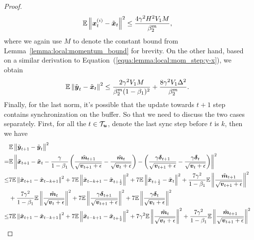 \begin{proof}
\begin{align*}
\mathbb{E}\left\| \boldsymbol{x}_t^{(i)} - \tilde{\boldsymbol{x}}_t \right\|^2 \leq \frac{4\gamma^2H^2V_1M}{\beta_2^m},
\end{align*}
where we again use $M$ to denote the constant bound from Lemma~\ref{lemma:local:momentum_bound} for brevity.
On the other hand, based on a similar derivation to Equation~(\ref{equa:lemma:local:mom_step:y-x}), we obtain
\begin{align*}
\mathbb{E}\left\| \tilde{\boldsymbol{y}}_t - \tilde{\boldsymbol{x}}_t \right\|^2 \leq \frac{2\gamma^2V_1M}{\beta_2^m(1-\beta_1)^2} + \frac{8\gamma^2V_1\Delta^2}{\beta_2^m}.
\end{align*}
Finally, for the last norm, it's possible that the update towards $t+1$ step contains synchronization on the buffer. So that we need to discuss the two cases separately. First, for all the $t\in\mathcal{T}_{\boldsymbol{u}}$, denote the last sync step before $t$ is $k$, then we have
\begin{align*}
    & \mathbb{E}\left\| \tilde{\*{y}}_{t+1} - \tilde{\*{y}}_t \right\|^2 \\
    = & \mathbb{E}\left\| \tilde{\*{x}}_{t+1} - \tilde{\*{x}}_t - \frac{\gamma}{1- \beta_1} \left(\frac{\tilde{\*{m}}_{t+1}}{\sqrt{\*v_{t+1}+\epsilon}} - \frac{\tilde{\*{m}}_{t}}{\sqrt{\*v_{t}+\epsilon}} \right) - \left( \frac{\gamma\*{\delta}_{t+1}}{\sqrt{\*v_{t+1}+\epsilon}} - \frac{\gamma\*{\delta}_{t}}{\sqrt{\*v_{t}+\epsilon}}\right) \right\|^2 \\
\leq & 7\mathbb{E}\left\| \tilde{\*{x}}_{t+1} - \tilde{\*{x}}_{t-k+1} \right\|^2 + 7\mathbb{E}\left\| \tilde{\*{x}}_{t-k+1} - \tilde{\*{x}}_{t+\frac{1}{2}} \right\|^2 + 
    7\mathbb{E}\left\| \tilde{\*{x}}_{t+\frac{1}{2}} - \tilde{\*{x}}_{t} \right\|^2 + 
    \frac{7\gamma^2}{1-\beta_1}\mathbb{E}\left\| \frac{\tilde{\*{m}}_{t+1}}{\sqrt{\*v_{t+1}+\epsilon}} \right\|^2 \\
    & + 
    \frac{7\gamma^2}{1-\beta_1}\mathbb{E}\left\| \frac{\tilde{\*{m}}_{t}}{\sqrt{\*v_{t}+\epsilon}} \right\|^2 + 
    7\mathbb{E}\left\| \frac{\gamma\*{\delta}_{t+1}}{\sqrt{\*v_{t+1}+\epsilon}} \right\|^2 + 
    7\mathbb{E}\left\| \frac{\gamma\*{\delta}_{t}}{\sqrt{\*v_{t}+\epsilon}} \right\|^2 \\
\leq & 7\mathbb{E}\left\| \tilde{\*{x}}_{t+1} - \tilde{\*{x}}_{t-k+1} \right\|^2 + 7\mathbb{E}\left\| \tilde{\*{x}}_{t-k+1} - \tilde{\*{x}}_{t+\frac{1}{2}} \right\|^2 + 
    7\gamma^2\mathbb{E}\left\| \frac{\tilde{\*m}_t}{\sqrt{\*v_t+\epsilon}} \right\|^2 + 
    \frac{7\gamma^2}{1-\beta_1}\mathbb{E}\left\| \frac{\tilde{\*{m}}_{t+1}}{\sqrt{\*v_{t+1}+\epsilon}} \right\|^2 \\

\end{align*}
\end{proof}
